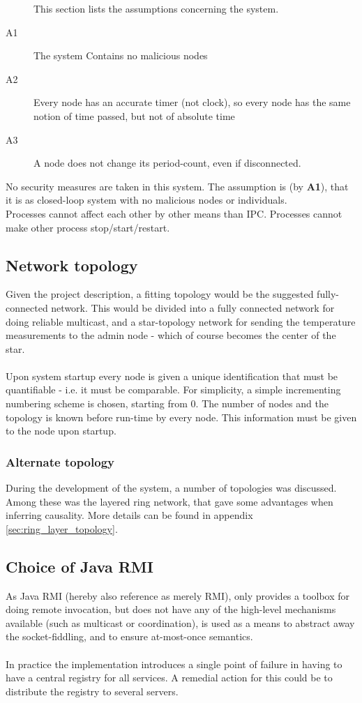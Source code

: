 \documentclass[10pt,a4paper]{article}
\begin{document}
\begin{description}
This section lists the assumptions concerning the system.
 \item[A1] The system Contains no malicious nodes
 \item[A2] Every node has an accurate timer (not clock), so every node has the same notion of time passed, but not of absolute time
 \item[A3] A node does not change its period-count, even if disconnected.
\end{description} 
No security measures are taken in this system. The assumption is (by \textbf{A1}), that it is as closed-loop system with no malicious nodes or individuals.\\
Processes cannot affect each other by other means than IPC. Processes cannot make other process stop/start/restart.

\subsection{Network topology}
Given the project description, a fitting topology would be the suggested fully-connected network. This would be divided into a fully connected network for doing reliable multicast, and a star-topology network for sending the temperature measurements to the admin node - which of course becomes the center of the star.\\\\
Upon system startup every node is given a unique identification that must be quantifiable - i.e. it must be comparable. For simplicity, a simple incrementing numbering scheme is chosen, starting from 0. The number of nodes and the topology is known before run-time by every node. This information must be given to the node upon startup.

\subsubsection{Alternate topology}
During the development of the system, a number of topologies was discussed. Among these was the layered ring network, that gave some advantages when inferring causality. More details can be found in appendix \ref{sec:ring_layer_topology}.

\subsection{Choice of Java RMI}
As Java RMI (hereby also reference as merely RMI), only provides a toolbox for doing remote invocation, but does not have any of the high-level mechanisms available (such as multicast or coordination), is used as a means to abstract away the socket-fiddling, and to ensure at-most-once semantics.\\\\
In practice the implementation introduces a single point of failure in having to have a central registry for all services. A remedial action for this could be to distribute the registry to several servers.
\end{document}
